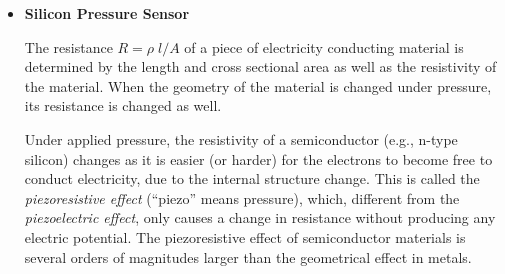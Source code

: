 \begin{itemize}
{\bf Light-Emitting Diode (LED)}

When a light-emitting diode is forward biased (turned on), electrons on the N side
can pass through the PN-junction to recombine with holes on the P side. These 
electrons fall to a lower level and release energy in the form of photons. This 
effect is called {\em electroluminescence} and the wavelength (color) of the light,
corresponding to the energy of the photon, is determined by the energy gap of the 
semiconductor.

In silicon or germanium diodes, the electrons and holes recombine by a non-radiative 
transition which produces no optical emission, because these are indirect band gap 
materials. The materials used for the LED, such as gallium arsenide (GaAs), have a 
direct band gap with energy corresponding to near-infrared, visible or even 
near-ultraviolet light.

\item {\bf Silicon Pressure Sensor}

The resistance $R=\rho\;l/A$ of a piece of electricity conducting material is
determined by the length and cross sectional area as well as the resistivity of 
the material. When the geometry of the material is changed under pressure, its 
resistance is changed as well.

Under applied pressure, the resistivity of a semiconductor (e.g., n-type silicon)
changes as it is easier (or harder) for the electrons to become free to conduct 
electricity, due to the internal structure change. This is called the 
{\em piezoresistive effect} (``piezo'' means pressure), which, different from the 
{\em piezoelectric effect}, only causes a change in resistance without producing 
any electric potential. The piezoresistive effect of semiconductor materials is 
several orders of magnitudes larger than the geometrical effect in metals. 

\end{itemize}


